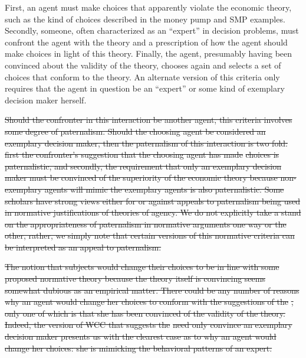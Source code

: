\documentclass[11pt,a4paper]{report}
\providecommand{\DIFdeltex}[1]{{\protect\color{red}\sout{#1}}}                      %
\providecommand{\DIFdelbegin}{} %
\providecommand{\DIFdel}[1]{\texorpdfstring{\DIFdeltex{#1}}{}} %
\newcommand{\DIFscaledelfig}{0.5}
\newlength{\DIFdelgraphicswidth} %
\newlength{\DIFdelgraphicsheight} %
\newcommand{\DIFdelincludegraphics}[2][]{%
\sbox{\DIFdelgraphicsbox}{\DIFOincludegraphics[#1]{#2}}%
\settoboxwidth{\DIFdelgraphicswidth}{\DIFdelgraphicsbox} %
\settoboxtotalheight{\DIFdelgraphicsheight}{\DIFdelgraphicsbox} %
\scalebox{\DIFscaledelfig}{%
\parbox[b]{\DIFdelgraphicswidth}{\usebox{\DIFdelgraphicsbox}\\[-\baselineskip] \rule{\DIFdelgraphicswidth}{0em}}\llap{\resizebox{\DIFdelgraphicswidth}{\DIFdelgraphicsheight}{%
\setlength{\unitlength}{\DIFdelgraphicswidth}%
\begin{picture}(1,1)%
\thicklines\linethickness{2pt} %
{\color[rgb]{1,0,0}\put(0,0){\framebox(1,1){}}}%
{\color[rgb]{1,0,0}\put(0,0){\line( 1,1){1}}}%
{\color[rgb]{1,0,0}\put(0,1){\line(1,-1){1}}}%
\end{picture}%
}\hspace*{3pt}}} %
} %
\DeclareRobustCommand{\DIFdelbegin}{\DIFOdelbegin \let\includegraphics\DIFdelincludegraphics} %
\begin{document}
First, an agent must make choices that apparently violate the economic theory, such as the kind of choices described in the money pump and SMP examples.
Secondly, someone, often characterized as an \enquote{expert} in decision problems, must confront the agent with the theory and a prescription of how the agent should make choices in light of this theory.
Finally, the agent, presumably having been convinced about the validity of the theory, chooses again and selects a set of choices that conform to the theory.
An alternate version of this criteria only requires that the agent in question be an \enquote{expert} or some kind of exemplary decision maker herself.

\DIFdelbegin \DIFdel{Should the confronter in this interaction be another agent, this criteria involves some degree of paternalism.
Should the choosing agent be considered an exemplary decision maker, then the paternalism of this interaction is two fold:
first the confronter's suggestion that the choosing agent has made }%
\DIFdel{choices is paternalistic, and secondly, the requirement that only an exemplary decision maker must be convinced of the superiority of the economic theory because non-exemplary agents will mimic the exemplary agents is also paternalistic.
Some scholars have strong views either for or against appeals to paternalism being used in normative justifications of theories of agency.
We do not explicitly take a stand on the appropriateness of paternalism in normative arguments one way or the other, rather, we simply note that certain versions of this normative criteria can be interpreted as an appeal to paternalism.
}%

\DIFdel{The notion that subjects would change their choices to be in line with some proposed normative theory because the theory itself is convincing seems somewhat dubious as an empirical matter.
There could be any number of reasons why an agent would change her choices to conform with the suggestions of the }%
\DIFdel{, only one of which is that she has been convinced of the validity of the theory.
Indeed, the version of WCC that suggests the }%
\DIFdel{need only convince an exemplary decision maker presents us with the clearest case as to why an agent would change her choices: she is mimicking the behavioral patterns of an expert.
}%
\end{document}
